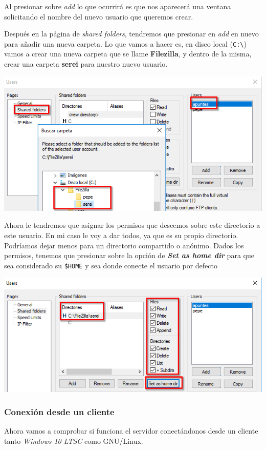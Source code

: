 \documentclass[11pt]{article}
\begin{document}
Al presionar sobre \emph{add} lo que ocurrirá es que nos aparecerá una ventana solicitando el nombre del nuevo usuario que queremos crear.

Después en la página de \emph{shared folders}, tendremos que presionar en \emph{add} en nuevo para añadir una nueva carpeta. Lo que vamos a hacer es, en disco local (\texttt{C:\textbackslash{}}) vamos a crear una nueva
carpeta que se llame \textbf{Filezilla}, y dentro de la misma, crear una carpeta \textbf{serei} para nuestro nuevo usuario.

\begin{center}
\includegraphics[width=.9\linewidth]{./media/3.png}
\end{center}

Ahora le tendremos que asignar los permisos que deseemos sobre este directorio a este usuario. En mi caso le voy a dar todos, ya que es su propio directorio. Podríamos dejar menos para un
directorio compartido o anónimo. Dados los permisos, tenemos que presionar sobre la opción de \textbf{\emph{Set as home dir}} para que sea considerado su \texttt{\$HOME} y sea donde conecte el usuario por defecto

\begin{center}
\includegraphics[width=.9\linewidth]{./media/4.png}
\end{center}

\subsubsection{Conexión desde un cliente}
\label{sec:org43fdea0}
Ahora vamos a comprobar si funciona el servidor conectándonos desde un cliente tanto \emph{Windows 10 LTSC} como GNU/Linux.
\end{document}
